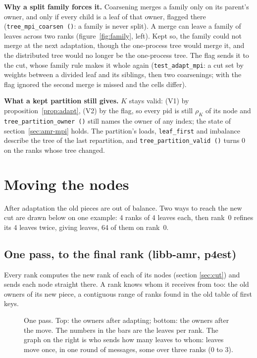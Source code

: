 \documentclass[10pt,a4paper]{article}
\theoremstyle{definition}
\newcommand{\fn}[1]{\texttt{#1}}
\begin{document}
\textbf{Why a split family forces it.} Coarsening merges a family only on
its parent's owner, and only if every child is a leaf of that owner,
flagged there (\fn{tree\_mpi\_coarsen ()}: a family is never split). A
merge can leave a family of leaves across two ranks
(figure~\ref{fig:family}, left). Kept so, the family could not merge at
the next adaptation, though the one-process tree would merge it, and the
distributed tree would no longer be the one-process tree. The flag sends
it to the cut, whose family rule makes it whole again
(\fn{test\_adapt\_mpi}: a cut set by weights between a divided leaf and
its siblings, then two coarsenings; with the flag ignored the second
merge is missed and the cells differ).

\textbf{What a kept partition still gives.} $K$ stays valid: (V1) by
proposition~\ref{prop:adapt}, (V2) by the flag, so every pid is still
$\rho_K$ of its node and \fn{tree\_partition\_owner ()} still names the
owner of any index; the state of section~\ref{sec:amr-mpi} holds. The
partition's loads, \fn{leaf\_first} and imbalance describe the tree of the
last repartition, and \fn{tree\_partition\_valid ()} turns 0 on the ranks
whose tree changed.

\section{Moving the nodes}

After adaptation the old pieces are out of balance. Two ways to reach the
new cut are drawn below on one example: 4 ranks of 4 leaves each, then
rank~0 refines its 4 leaves twice, giving \mleaves{} leaves, 64 of them on
rank~0.

\subsection{One pass, to the final rank (libb-amr, p4est)}

Every rank computes the new rank of each of its nodes (section
\ref{sec:cut}) and sends each node straight there. A rank knows whom it
receives from too: the old owners of its new piece, a contiguous range of
ranks found in the old table of first keys.

\begin{figure}[h]
  \centering
  \begin{tikzpicture}\end{tikzpicture}
  \caption{One pass. Top: the owners after adapting; bottom: the owners
    after the move. The numbers in the bars are the leaves per rank. The
    graph on the right is who sends how many leaves to whom:
    \movedonce{} leaves move once, in one round of \pairsonce{} messages,
    some over three ranks (0 to 3).}
  \label{fig:onepass}
\end{figure}
\end{document}
